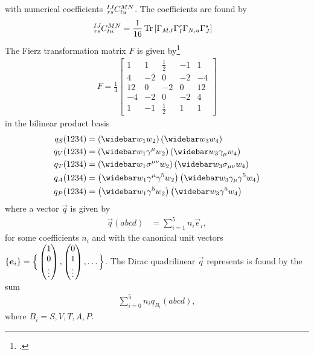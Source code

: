 \documentclass[english,notitlepage]{article}
\begin{document}
    with numerical coefficients \(\tensor*[^{IJ}_{rs}]{C}{^{MN}_{tu}}\). The coefficients are found by
    \begin{align}
        \tensor*[^{IJ}_{rs}]{C}{^{MN}_{tu}} & = \frac{1}{16} \tr\bclosed{\Gamma_{M,t} \Gamma_I^r \Gamma_{N,u} \Gamma_J^{s}}
    \end{align}
    The Fierz transformation matrix \(F\) is given by\footcite{Nieves:2003in}
    \begin{align}
        F = \frac{1}{4}
        \begin{bmatrix}
            1  & 1  & \frac{1}{2} & -1 & 1  \\
            4  & -2 & 0           & -2 & -4 \\
            12 & 0  & -2          & 0  & 12 \\
            -4 & -2 & 0           & -2 & 4  \\
            1  & -1 & \frac{1}{2} & 1  & 1
        \end{bmatrix}
    \end{align}
    in the bilinear product basis
    \begin{subequations}
        \begin{align}
            q_S(1234) & = \pclosed{\wbar{w}_1 w_2} \pclosed{\wbar{w}_3 w_4}                                         \\
            q_V(1234) & = \pclosed{\wbar{w}_1 \gamma^\mu w_2} \pclosed{\wbar{w}_3 \gamma_\mu w_4}                   \\
            q_T(1234) & = \pclosed{\wbar{w}_1 \sigma^{\mu\nu} w_2} \pclosed{\wbar{w}_3 \sigma_{\mu\nu} w_4}         \\
            q_A(1234) & = \pclosed{\wbar{w}_1 \gamma^\mu \gamma^5 w_2} \pclosed{\wbar{w}_3 \gamma_\mu \gamma^5 w_4} \\
            q_P(1234) & = \pclosed{\wbar{w}_1 \gamma^5 w_2} \pclosed{\wbar{w}_3 \gamma^5 w_4}                       \\
        \end{align}
    \end{subequations}
    where a vector \(\vec{q}\) is given by
    \begin{align}
        \vec{q}(abcd) & = \sum_{i=1}^5 n_i \vec{e}_i,
    \end{align}
    for some coefficients \(n_i\) and with the canonical unit vectors \(\left\{\boldsymbol{e}_i\right\} = \Big\{\begin{pmatrix} 1\\0\\\vdots \end{pmatrix}, \begin{pmatrix} 0\\1\\\vdots \end{pmatrix}, \ldots \Big\}\).
    The Dirac quadrilinear \(\vec{q}\) represents is found by the sum
    \begin{align}
        \sum_{i=0}^{5} n_i q_{B_i}(abcd),
    \end{align}
    where \(B_i = S, V, T, A, P\).
\end{document}
